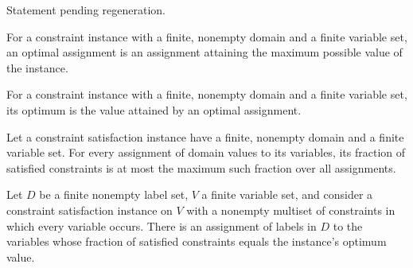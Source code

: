 \begin{theorem}
\label{FABL.CSPInstance.value_eq_one_iff_fullySatisfied}
\leanok
{}
Statement pending regeneration.
\end{theorem}

\begin{definition}
\label{FABL.CSPInstance.optimalAssignment}
\leanok
{}
For a constraint instance with a finite, nonempty domain and a finite variable set, an
optimal assignment is an assignment attaining the maximum possible value of the
instance.
\end{definition}

\begin{definition}
\label{FABL.CSPInstance.optimum}
\leanok
{}
For a constraint instance with a finite, nonempty domain and a finite variable set, its
optimum is the value attained by an optimal assignment.
\end{definition}

\begin{theorem}
\label{FABL.CSPInstance.value_le_optimum}
\leanok
{}
Let a constraint satisfaction instance have a finite, nonempty domain and a finite
variable set. For every assignment of domain values to its variables, its fraction of
satisfied constraints is at most the maximum such fraction over all assignments.
\end{theorem}

\begin{theorem}
\label{FABL.CSPInstance.exists_value_eq_optimum}
\leanok
{}
Let $D$ be a finite nonempty label set, $V$ a finite variable set, and consider a
constraint satisfaction instance on $V$ with a nonempty multiset of constraints in which
every variable occurs. There is an assignment of labels in $D$ to the variables whose
fraction of satisfied constraints equals the instance's optimum value.
\end{theorem}

